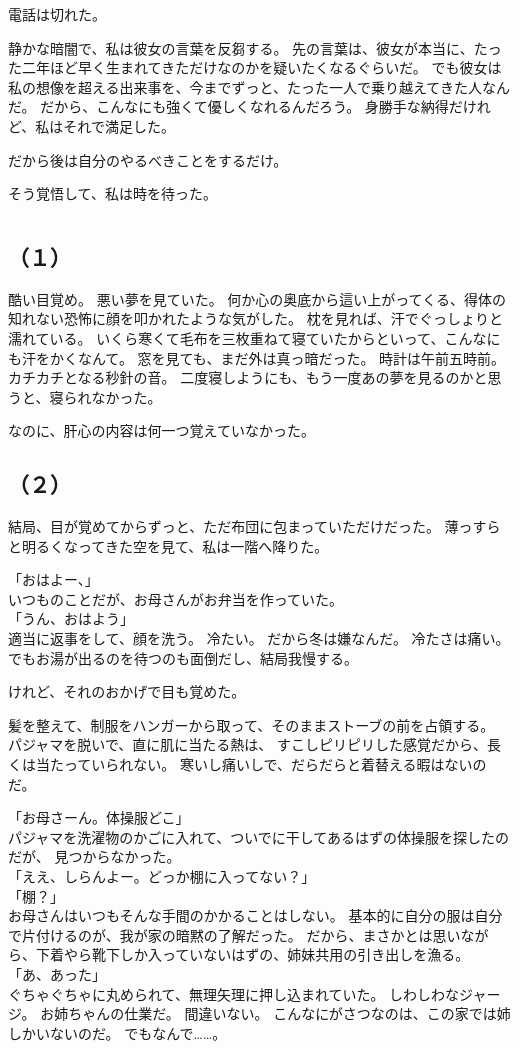 \documentclass[../IHMain]{subfiles}
\begin{document}
電話は切れた。

静かな暗闇で、私は彼女の言葉を反芻する。
先の言葉は、彼女が本当に、たった二年ほど早く生まれてきただけなのかを疑いたくなるぐらいだ。
でも彼女は私の想像を超える出来事を、今までずっと、たった一人で乗り越えてきた人なんだ。
だから、こんなにも強くて優しくなれるんだろう。
身勝手な納得だけれど、私はそれで満足した。

だから後は自分のやるべきことをするだけ。

そう覚悟して、私は時を待った。

\section{}
\subsection*{\gt \centering（１）}
酷い目覚め。
悪い夢を見ていた。
何か心の奥底から這い上がってくる、得体の知れない恐怖に顔を叩かれたような気がした。
枕を見れば、汗でぐっしょりと濡れている。
いくら寒くて毛布を三枚重ねて寝ていたからといって、こんなにも汗をかくなんて。
窓を見ても、まだ外は真っ暗だった。
時計は午前五時前。
カチカチとなる秒針の音。
二度寝しようにも、もう一度あの夢を見るのかと思うと、寝られなかった。

なのに、肝心の内容は何一つ覚えていなかった。

\subsection*{\gt（２）}
結局、目が覚めてからずっと、ただ布団に包まっていただけだった。
薄っすらと明るくなってきた空を見て、私は一階へ降りた。

「おはよー、」\\
いつものことだが、お母さんがお弁当を作っていた。\\
「うん、おはよう」\\
適当に返事をして、顔を洗う。
冷たい。
だから冬は嫌なんだ。
冷たさは痛い。
でもお湯が出るのを待つのも面倒だし、結局我慢する。

けれど、それのおかげで目も覚めた。

髪を整えて、制服をハンガーから取って、そのままストーブの前を占領する。
パジャマを脱いで、直に肌に当たる熱は、
すこしピリピリした感覚だから、長くは当たっていられない。
寒いし痛いしで、だらだらと着替える暇はないのだ。

「お母さーん。体操服どこ」\\
パジャマを洗濯物のかごに入れて、ついでに干してあるはずの体操服を探したのだが、
見つからなかった。\\
「ええ、しらんよー。どっか棚に入ってない？」\\
「棚？」\\
お母さんはいつもそんな手間のかかることはしない。
基本的に自分の服は自分で片付けるのが、我が家の暗黙の了解だった。
だから、まさかとは思いながら、下着やら靴下しか入っていないはずの、姉妹共用の引き出しを漁る。\\
「あ、あった」\\
ぐちゃぐちゃに丸められて、無理矢理に押し込まれていた。
しわしわなジャージ。
お姉ちゃんの仕業だ。
間違いない。
こんなにがさつなのは、この家では姉しかいないのだ。
でもなんで……。
\end{document}
